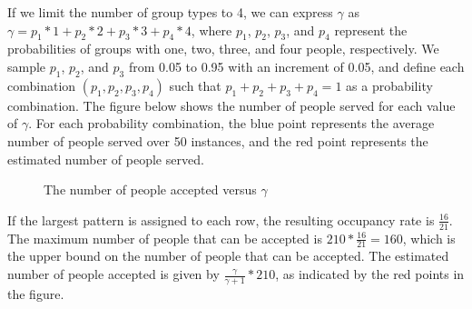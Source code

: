 If we limit the number of group types to 4, we can express $\gamma$ as $\gamma = p_1 * 1 + p_2 * 2 + p_3 * 3 + p_4 * 4$, where $p_1$, $p_2$, $p_3$, and $p_4$ represent the probabilities of groups with one, two, three, and four people, respectively. We sample $p_1$, $p_2$, and $p_3$ from 0.05 to 0.95 with an increment of 0.05, and define each combination $(p_1, p_2, p_3, p_4)$ such that $p_1 + p_2 + p_3 + p_4 = 1$ as a probability combination. The figure below shows the number of people served for each value of $\gamma$. For each probability combination, the blue point represents the average number of people served over 50 instances, and the red point represents the estimated number of people served.



\begin{figure}[h]
  \centering
  \caption{The number of people accepted versus $\gamma$}
\end{figure}


If the largest pattern is assigned to each row, the resulting occupancy rate is $\frac{16}{21}$. The maximum number of people that can be accepted is $210 * \frac{16}{21} = 160$, which is the upper bound on the number of people that can be accepted. The estimated number of people accepted is given by $\frac{\gamma}{\gamma+1} * 210$, as indicated by the red points in the figure.

